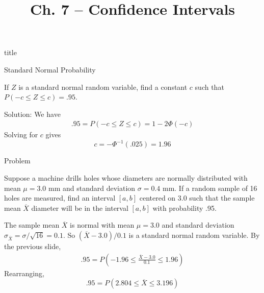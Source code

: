 \documentclass{beamer}
\title{Ch. 7 -- Confidence Intervals}
\begin{document}
\begin{frame}
\begin{beamercolorbox}[rounded=true,wd=\textwidth,center]{title}
\inserttitle
\end{beamercolorbox}
\end{frame} 

\begin{frame}{Standard Normal Probability}
\begin{block}{}
If $Z$ is a standard normal random variable, find a constant $c$ such that $P(-c \leq Z \leq c)=.95$.
\end{block}
\pause Solution: We have
\begin{align*}
.95 = P(-c \leq Z \leq c) = 1-2\Phi(-c)
\end{align*}
\pause Solving for $c$ gives
$$c = -\Phi^{-1}(.025) = 1.96$$
\end{frame}

\begin{frame}{Problem}
\begin{block}{}
Suppose a machine drills holes whose diameters are normally distributed with mean $\mu=3.0 $ mm and standard deviation $\sigma=0.4$ mm. If a random sample of 16 holes are measured, find an interval $[a,b]$ centered on 3.0 such that the sample mean $\overline{X}$ diameter will be in the interval $[a,b]$ with probability .95.
\end{block}
\pause The sample mean $\overline{X}$ is normal with mean $\mu=3.0$ and standard deviation $\sigma_{\overline X} = \sigma/\sqrt{16} = 0.1$. So $(\overline X-3.0)/0.1$ is a standard normal random variable. 
\pause By the previous slide,
\begin{align*}
.95 = P(-1.96 \leq \frac{\overline X-3.0}{0.1} \leq 1.96)
\end{align*}
\pause Rearranging,
$$.95 = P(2.804 \leq \overline{X} \leq 3.196)$$
\end{frame}
\end{document}
